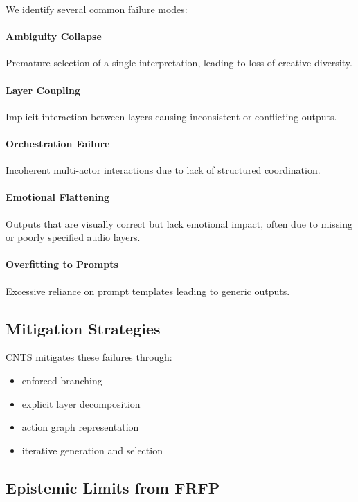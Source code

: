 \documentclass[preprints,article,submit,pdftex,moreauthors,accept]{Definitions/mdpi}
\begin{document}
We identify several common failure modes:

\paragraph{Ambiguity Collapse}
Premature selection of a single interpretation, leading to loss of creative diversity.

\paragraph{Layer Coupling}
Implicit interaction between layers causing inconsistent or conflicting outputs.

\paragraph{Orchestration Failure}
Incoherent multi-actor interactions due to lack of structured coordination.

\paragraph{Emotional Flattening}
Outputs that are visually correct but lack emotional impact, often due to missing or poorly specified audio layers.

\paragraph{Overfitting to Prompts}
Excessive reliance on prompt templates leading to generic outputs.

\subsection{Mitigation Strategies}

CNTS mitigates these failures through:

\begin{itemize}
    \item enforced branching
    \item explicit layer decomposition
    \item action graph representation
    \item iterative generation and selection
\end{itemize}

\subsection{Epistemic Limits from FRFP}
\end{document}

